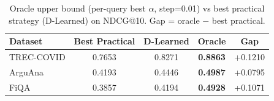 \begin{table}[ht]
\centering
\small
\caption{Oracle upper bound (per-query best $\alpha$, step=0.01) vs best practical strategy (D-Learned) on NDCG@10. Gap = oracle $-$ best practical.}
\label{tab:oracle}
\begin{tabular}{lcccc}
\toprule
Dataset & Best Practical & D-Learned & Oracle & Gap \\
\midrule
TREC-COVID & 0.7653 & 0.8271 & \textbf{0.8863} & +0.1210 \\
ArguAna & 0.4193 & 0.4446 & \textbf{0.4987} & +0.0795 \\
FiQA & 0.3857 & 0.4194 & \textbf{0.4928} & +0.1071 \\
\bottomrule
\end{tabular}
\end{table}

